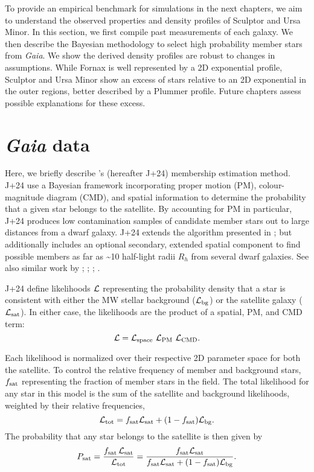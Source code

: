 To provide an empirical benchmark for simulations in the next chapters,
we aim to understand the observed properties and density profiles of
Sculptor and Ursa Minor. In this section, we first compile past
measurements of each galaxy. We then describe the \citet{jensen+2024}
Bayesian methodology to select high probability member stars from
\emph{Gaia}. We show the derived density profiles are robust to changes
in assumptions. While Fornax is well represented by a 2D exponential
profile, Sculptor and Ursa Minor show an excess of stars relative to an
2D exponential in the outer regions, better described by a Plummer
profile. Future chapters assess possible explanations for these excess.

\section{\texorpdfstring{\emph{Gaia} data}{Gaia data}}\label{gaia-data}

Here, we briefly describe \citet{jensen+2024}'s (hereafter J+24)
membership estimation method. J+24 use a Bayesian framework
incorporating proper motion (PM), colour-magnitude diagram (CMD), and
spatial information to determine the probability that a given star
belongs to the satellite. By accounting for PM in particular, J+24
produces low contamination samples of candidate member stars out to
large distances from a dwarf galaxy. J+24 extends the algorithm
presented in \citet{MV2020a}; \citet{MV2020b} but additionally includes
an optional secondary, extended spatial component to find possible
members as far as \textasciitilde10 half-light radii \(R_h\) from
several dwarf galaxies. See also similar work by \citet{pace+li2019};
\citet{battaglia+2022}; \citet{pace+erkal+li2022}; \citet{qi+2022}.

J+24 define likelihoods \({\cal L}\) representing the probability
density that a star is consistent with either the MW stellar background
(\({\cal L}_{\rm bg}\)) or the satellite galaxy
(\({\cal L}_{\rm sat}\)). In either case, the likelihoods are the
product of a spatial, PM, and CMD term: \begin{equation}{
{\cal L} = {\cal L}_{\rm space}\ {\cal L}_{\rm PM}\ {\cal L}_{\rm CMD}.
}\end{equation}

Each likelihood is normalized over their respective 2D parameter space
for both the satellite. To control the relative frequency of member and
background stars, \(f_{\rm sat}\) representing the fraction of member
stars in the field. The total likelihood for any star in this model is
the sum of the satellite and background likelihoods, weighted by their
relative frequencies, \begin{equation}{
{\cal L}_{\rm tot} = f_{\rm sat}{\cal L}_{\rm sat} + (1-f_{\rm sat}){\cal L}_{\rm bg}.
}\end{equation} The probability that any star belongs to the satellite
is then given by \begin{equation}{
P_{\rm sat} = 
\frac{f_{\rm sat}\,{\cal L}_{\rm sat}}{{\cal L}_{\rm tot}}
= \frac{f_{\rm sat}{\cal L}_{\rm sat}}{f_{\rm sat}{\cal L}_{\rm sat} + (1-f_{\rm sat}){\cal L}_{\rm bg}}.
}\end{equation}

